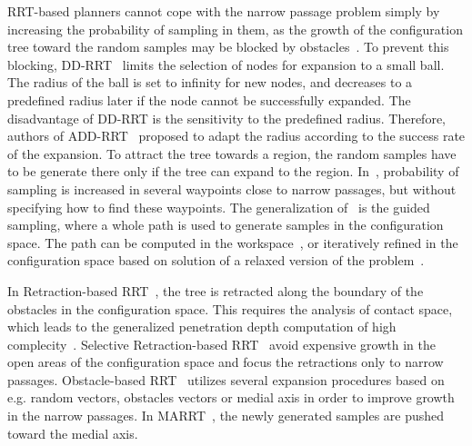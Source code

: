 \documentclass[usletter, 10pt, conference]{ieeeconf} %
\def\qrand{q_{rand}}
\def\qnear{q_{near}}
\begin{document}
RRT-based planners cannot cope with the narrow passage problem simply by increasing the probability of sampling in them, as the
growth of the configuration tree toward the random samples may be blocked by obstacles~\cite{vonasekphd}.
To prevent this blocking, DD-RRT~\cite{yershovaDDRRT} limits the selection of nodes for expansion to a small ball. 
The radius of the ball is set to infinity for new nodes, and decreases to a predefined radius later if the node cannot be successfully expanded.
The disadvantage of DD-RRT is the sensitivity to the predefined radius.
Therefore, authors of ADD-RRT~\cite{jailletADRRT} proposed to adapt the radius  according to the success rate of the expansion.
To attract the tree towards a region, the random samples have to be generate there only if the tree can expand to the region.
In~\cite{kardossRRTKK}, probability of sampling is increased in several waypoints close to narrow passages, but without specifying
how to find these waypoints.
The generalization of~\cite{kardossRRTKK} is the guided sampling, where a whole path is used
to generate samples in the configuration space.
The path can be computed in the workspace~\cite{vonasek2009rrt}, or iteratively refined in the configuration space based on solution of a relaxed version of the problem~\cite{bayazitIRC}.


In Retraction-based RRT~\cite{zhangRetraction}, the tree is retracted along the boundary of the obstacles in the configuration space.
This requires the analysis of contact space, which leads to the generalized penetration depth computation of high complecity~\cite{zhang2008fast,he2016efficient}. %
Selective Retraction-based RRT~\cite{lee2012srrrt} avoid expensive growth in the open areas of the configuration space and focus
the retractions only to narrow passages.
Obstacle-based RRT~\cite{amatoOBRRT} utilizes several expansion procedures based on e.g. random vectors, obstacles vectors or medial axis in order to improve growth in the narrow passages.
In MARRT~\cite{denny2014marrt}, the newly generated samples are pushed toward the medial axis.
\end{document}
